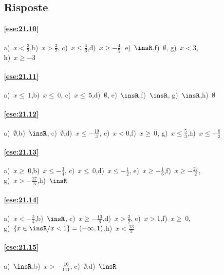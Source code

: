 \subsection{Risposte}

\begin{multicols}{2}
 \paragraph{\ref{ese:21.10}} a)~\(x<\frac{3}{2}\),\quad b)~\(x>\frac{3}{2}\),\quad
c)~\(x\le \frac{4}{3}\),\quad d)~\(x\ge -{\frac{4}{5}}\),\quad
e)~\(\insR\),\quad f)~\(\emptyset \),\quad
g)~\(x<3\),\quad \protect\\ h)~\(x\ge -3\)

\paragraph{\ref{ese:21.11}} a)~\(x\le~1\),\quad b)~\(x\le~0\),\quad
c)~\(x\le~5\),\quad d)~\(\emptyset \),\quad
e)~\(\insR\),\quad f)~\(\insR\),\quad
g)~\(\insR \),\quad h)~\(\emptyset \)

\paragraph{\ref{ese:21.12}} a)~\(\emptyset \),\quad b)~\(\insR\),\quad
c)~\(\emptyset \),\quad d)~\(x\le -{\frac{10}{3}}\),\quad
e)~\(x<0\),\quad f)~\(x\ge~0\),\quad
g)~\(x\le \frac{5}{3}\),\quad h)~\(x\le -{\frac{8}{3}}\)

\paragraph{\ref{ese:21.13}} a)~\(x\ge~0\),\quad b)~\(x\le -{\frac{3}{4}}\),\quad
c)~\(x\le~0\),\quad d)~\(x\le -{\frac{1}{2}}\),\quad
e)~\(x\ge -{\frac{1}{6}}\),\quad f)~\(x\ge -{\frac{27}{2}}\),\quad
\protect\\g)~\(x>-{\frac{27}{5}}\),\quad h)~\(\insR\)

\paragraph{\ref{ese:21.14}} a)~\(x<-{\frac{3}{4}}\),\quad b)~\(\insR\),\quad
c)~\(x\ge -{\frac{13}{6}}\),\quad d)~\(x>\frac{3}{2}\),\quad
e)~\(x>1\),\quad f)~\(x\ge~0\),\quad\protect\\
g)~\(\{x\in\insR/x<1\}=(-\infty,1)\),\quad h)~\(x<\frac{13}{2}\)

\paragraph{\ref{ese:21.15}} a)~\(\insR\),\quad b)~\(x>-{\frac{10}{111}}\),\quad
c)~\(\emptyset \),\quad d)~\(\insR\)


\end{multicols}
